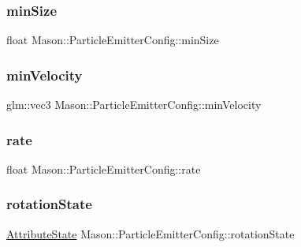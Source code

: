 \subsubsection{\texorpdfstring{min\+Size}{minSize}}
{\footnotesize\ttfamily float Mason\+::\+Particle\+Emitter\+Config\+::min\+Size}

\hypertarget{struct_mason_1_1_particle_emitter_config_a3d8df085c0a91b61f42adc5eef888c79}{}\label{struct_mason_1_1_particle_emitter_config_a3d8df085c0a91b61f42adc5eef888c79} 
\subsubsection{\texorpdfstring{min\+Velocity}{minVelocity}}
{\footnotesize\ttfamily glm\+::vec3 Mason\+::\+Particle\+Emitter\+Config\+::min\+Velocity}

\hypertarget{struct_mason_1_1_particle_emitter_config_abc0c7231f9134e3b0456d22ee8d5c8a2}{}\label{struct_mason_1_1_particle_emitter_config_abc0c7231f9134e3b0456d22ee8d5c8a2} 
\subsubsection{\texorpdfstring{rate}{rate}}
{\footnotesize\ttfamily float Mason\+::\+Particle\+Emitter\+Config\+::rate}

\hypertarget{struct_mason_1_1_particle_emitter_config_a35b60fea30c8a07adcfc77a3c30e1546}{}\label{struct_mason_1_1_particle_emitter_config_a35b60fea30c8a07adcfc77a3c30e1546} 
\subsubsection{\texorpdfstring{rotation\+State}{rotationState}}
{\footnotesize\ttfamily \hyperlink{namespace_mason_aefc2ce7d9295b57af46ab6c8ebfc32f7}{Attribute\+State} Mason\+::\+Particle\+Emitter\+Config\+::rotation\+State}

